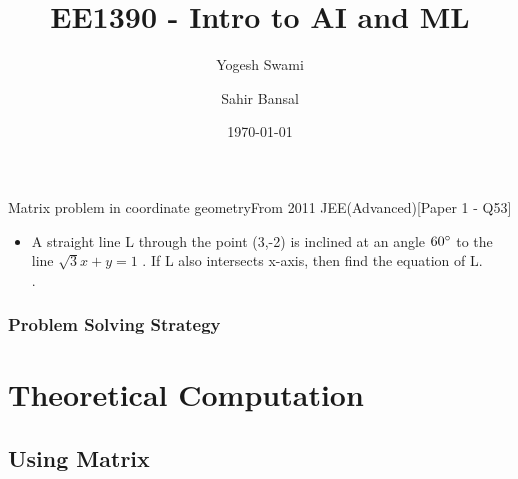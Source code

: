 \documentclass{beamer}
\title[Matrix Project]{EE1390 - Intro to AI and ML}
\author{Yogesh Swami\inst{1} \and Sahir Bansal\inst{2}} %
\institute[IIT Hyderabad]
{
  \inst{1}%
  EP17BTECH11019
  \and
  \inst{2}%
  EE17BTECH11035
}
\date{\today} %
\begin{document}
\begin{frame}
\titlepage %
\end{frame}


\begin{frame}{Matrix problem in coordinate geometry}{From 2011 JEE(Advanced)[Paper 1 - Q53]}
  \begin{itemize}
\item A straight line L through the point (3,-2) is inclined at an angle $60\degree$ to the line $\sqrt{3}x +y = 1$ . If L also intersects x-axis, then find the equation of L.
\\
  .
  \end{itemize}
\end{frame}


\begin{frame}
\frametitle{Problem Solving Strategy} %
\tableofcontents %
\end{frame}




\section{Theoretical Computation} %


\subsection{Using Matrix} %
\end{document}

